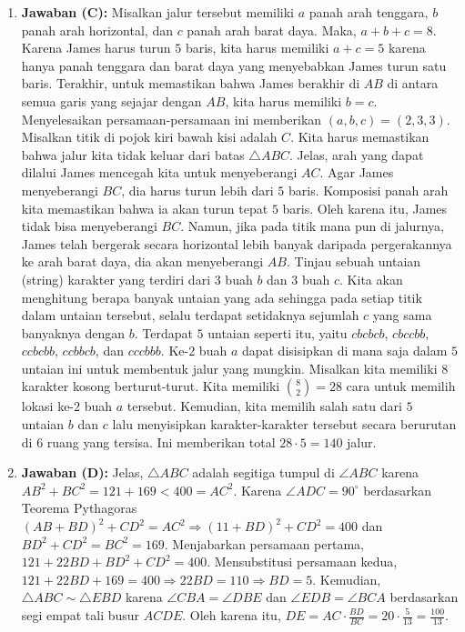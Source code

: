 \documentclass[12pt]{scrartcl}
\begin{document}
\begin{enumerate}
\item \textbf{Jawaban (C):} Misalkan jalur tersebut memiliki $a$ panah arah tenggara, $b$ panah arah horizontal, dan $c$ panah arah barat daya. Maka, $a+b+c=8$. Karena James harus turun $5$ baris, kita harus memiliki $a+c=5$ karena hanya panah tenggara dan barat daya yang menyebabkan James turun satu baris. Terakhir, untuk memastikan bahwa James berakhir di $AB$ di antara semua garis yang sejajar dengan $AB$, kita harus memiliki $b=c$. Menyelesaikan persamaan-persamaan ini memberikan $(a,b,c)=(2,3,3)$. Misalkan titik di pojok kiri bawah kisi adalah $C$. Kita harus memastikan bahwa jalur kita tidak keluar dari batas $\triangle ABC$. Jelas, arah yang dapat dilalui James mencegah kita untuk menyeberangi $AC$. Agar James menyeberangi $BC$, dia harus turun lebih dari $5$ baris. Komposisi panah arah kita memastikan bahwa ia akan turun tepat $5$ baris. Oleh karena itu, James tidak bisa menyeberangi $BC$. Namun, jika pada titik mana pun di jalurnya, James telah bergerak secara horizontal lebih banyak daripada pergerakannya ke arah barat daya, dia akan menyeberangi $AB$. Tinjau sebuah untaian (string) karakter yang terdiri dari $3$ buah $b$ dan $3$ buah $c$. Kita akan menghitung berapa banyak untaian yang ada sehingga pada setiap titik dalam untaian tersebut, selalu terdapat setidaknya sejumlah $c$ yang sama banyaknya dengan $b$. Terdapat $5$ untaian seperti itu, yaitu $cbcbcb$, $cbccbb$, $ccbcbb$, $ccbbcb$, dan $cccbbb$. Ke-$2$ buah $a$ dapat disisipkan di mana saja dalam $5$ untaian ini untuk membentuk jalur yang mungkin. Misalkan kita memiliki $8$ karakter kosong berturut-turut. Kita memiliki $\binom{8}{2}=28$ cara untuk memilih lokasi ke-$2$ buah $a$ tersebut. Kemudian, kita memilih salah satu dari $5$ untaian $b$ dan $c$ lalu menyisipkan karakter-karakter tersebut secara berurutan di $6$ ruang yang tersisa. Ini memberikan total $28\cdot5=140$ jalur.

\item \textbf{Jawaban (D):} Jelas, $\triangle ABC$ adalah segitiga tumpul di $\angle ABC$ karena $AB^{2}+BC^{2}=121+169<400=AC^{2}$. Karena $\angle ADC=90^{\circ}$ berdasarkan Teorema Pythagoras $(AB+BD)^{2}+CD^{2}=AC^{2}\Rightarrow(11+BD)^{2}+CD^{2}=400$ dan $BD^{2}+CD^{2}=BC^{2}=169$. Menjabarkan persamaan pertama, $121+22BD+BD^{2}+CD^{2}=400$. Mensubstitusi persamaan kedua, $121+22BD+169=400\Rightarrow22BD=110\Rightarrow BD=5$. Kemudian, $\triangle ABC \sim \triangle EBD$ karena $\angle CBA=\angle DBE$ dan $\angle EDB=\angle BCA$ berdasarkan segi empat tali busur $ACDE$. Oleh karena itu, $DE=AC\cdot\frac{BD}{BC}=20\cdot\frac{5}{13}=\frac{100}{13}$.


\end{enumerate}
\end{document}
